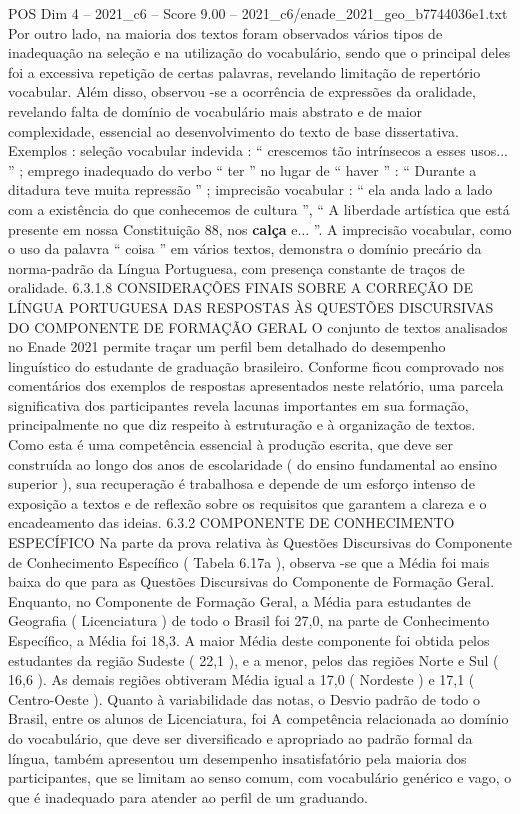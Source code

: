 \begin{textsample}{POS Dim 4 – 2021\_c6 – Score 9.00 – 2021\_c6/enade\_2021\_geo\_b7744036e1.txt}
Por outro lado, na maioria dos textos foram observados vários tipos de inadequação na seleção e na utilização do vocabulário, sendo que o principal deles foi a excessiva repetição de certas palavras, revelando limitação de repertório vocabular.
Além disso, observou -se a ocorrência de expressões da oralidade, revelando falta de domínio de vocabulário mais abstrato e de maior complexidade, essencial ao desenvolvimento do texto de base dissertativa.
Exemplos : seleção vocabular indevida : “ crescemos tão intrínsecos a esses usos... ” ; emprego inadequado do verbo “ ter ” no lugar de “ haver ” : “ Durante a ditadura teve muita repressão ” ; imprecisão vocabular : “ ela anda lado a lado com a existência do que conhecemos de cultura ”, “ A liberdade artística que está presente em nossa Constituição 88, nos \textbf{calça} e... ”.
A imprecisão vocabular, como o uso da palavra “ coisa ” em vários textos, demonstra o domínio precário da norma-padrão da Língua Portuguesa, com presença constante de traços de oralidade. 6.3.1.8 CONSIDERAÇÕES FINAIS SOBRE A CORREÇÃO DE LÍNGUA PORTUGUESA DAS RESPOSTAS ÀS QUESTÕES DISCURSIVAS DO COMPONENTE DE FORMAÇÃO GERAL O conjunto de textos analisados no Enade 2021 permite traçar um perfil bem detalhado do desempenho linguístico do estudante de graduação brasileiro.
Conforme ficou comprovado nos comentários dos exemplos de respostas apresentados neste relatório, uma parcela significativa dos participantes revela lacunas importantes em sua formação, principalmente no que diz respeito à estruturação e à organização de textos.
Como esta é uma competência essencial à produção escrita, que deve ser construída ao longo dos anos de escolaridade ( do ensino fundamental ao ensino superior ), sua recuperação é trabalhosa e depende de um esforço intenso de exposição a textos e de reflexão sobre os requisitos que garantem a clareza e o encadeamento das ideias. 6.3.2 COMPONENTE DE CONHECIMENTO ESPECÍFICO Na parte da prova relativa às Questões Discursivas do Componente de Conhecimento Específico ( Tabela 6.17a ), observa -se que a Média foi mais baixa do que para as Questões Discursivas do Componente de Formação Geral.
Enquanto, no Componente de Formação Geral, a Média para estudantes de Geografia ( Licenciatura ) de todo o Brasil foi 27,0, na parte de Conhecimento Específico, a Média foi 18,3.
A maior Média deste componente foi obtida pelos estudantes da região Sudeste ( 22,1 ), e a menor, pelos das regiões Norte e Sul ( 16,6 ).
As demais regiões obtiveram Média igual a 17,0 ( Nordeste ) e 17,1 ( Centro-Oeste ).
Quanto à variabilidade das notas, o Desvio padrão de todo o Brasil, entre os alunos de Licenciatura, foi A competência relacionada ao domínio do vocabulário, que deve ser diversificado e apropriado ao padrão formal da língua, também apresentou um desempenho insatisfatório pela maioria dos participantes, que se limitam ao senso comum, com vocabulário genérico e vago, o que é inadequado para atender ao perfil de um graduando.

\end{textsample}
